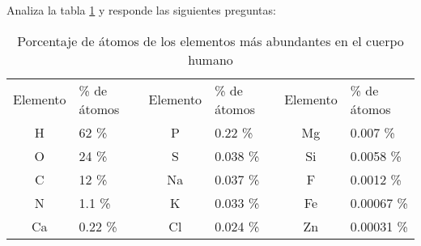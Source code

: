 \question Analiza la tabla \ref{tab:masa} y responde las siguientes preguntas:
\renewcommand{\arraystretch}{1.1}

\begin{table}[H]
    \centering
    \begin{tabular}{clclcl}
        {\footnotesize \cellcolor[HTML]{FFCE93}Elemento    } &
        {\footnotesize \cellcolor[HTML]{E4E4C0}\% de átomos} &
        {\footnotesize \cellcolor[HTML]{FFCE93}Elemento    } &
        {\footnotesize \cellcolor[HTML]{E4E4C0}\% de átomos} &
        {\footnotesize \cellcolor[HTML]{FFCE93}Elemento    } &
        {\footnotesize \cellcolor[HTML]{E4E4C0}\% de átomos}
        \\
        H                                                    & 62 \%   & P           &
        0.22 \%                                              & Mg      & 0.007 \%      \\
        O                                                    & 24 \%   & S           &
        0.038 \%                                             & Si      & 0.0058 \%     \\
        C                                                    & 12 \%   & Na          &
        0.037  \%                                            & F       & 0.0012   \%   \\
        N                                                    & 1.1 \%  & K           &
        0.033 \%                                             & Fe      & 0.00067 \%    \\
        Ca                                                   & 0.22 \% & Cl          &
        0.024 \%                                             & Zn      & 0.00031 \%
    \end{tabular}
    \caption{Porcentaje de átomos de los elementos más abundantes en el cuerpo
        humano}
    \label{tab:masa}
\end{table}

\begin{parts}
    
    
    
\end{parts}
